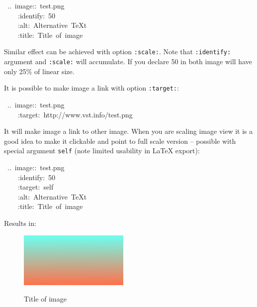 \documentclass[12pt]{article}
\begin{document}
\begin{ttfamily}\begin{flushleft}
\mbox{~..~image::~test.png}\\
\mbox{~~~~:identify:~50}\\
\mbox{~~~~:alt:~Alternative~\TeX{}t}\\
\mbox{~~~~:title:~Title~of~image}\\
\end{flushleft}\end{ttfamily}

Similar effect can be achieved with option \texttt{:scale:}. Note that
\texttt{:identify:} argument and \texttt{:scale:} will accumulate. If you declare 50 in
both image will have only 25\% of linear size.

It is possible to make image a link with option \texttt{:target:}:

\begin{ttfamily}\begin{flushleft}
\mbox{~..~image::~test.png}\\
\mbox{~~~~:target:~http://www.vst.info/test.png}\\
\end{flushleft}\end{ttfamily}

It will make image a link to other image. When you are scaling image
view it is a good idea to make it clickable and point to full scale
version -- possible with special argument \texttt{self} (note limited
usability in \LaTeX{} export):

\begin{ttfamily}\begin{flushleft}
\mbox{~..~image::~test.png}\\
\mbox{~~~~:identify:~50}\\
\mbox{~~~~:target:~self}\\
\mbox{~~~~:alt:~Alternative~\TeX{}t}\\
\mbox{~~~~:title:~Title~of~image}\\
\end{flushleft}\end{ttfamily}

Results in:

\begin{figure}[ht]\centering\href{test.png}{\includegraphics{test.png}}\caption{Title of image}\end{figure}
\hypertarget{lfigures}{}
\end{document}
